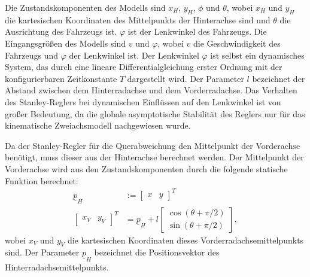 \documentclass[arbeit=studie,oneside,BCOR=12mm]{ArbeitRST}
\begin{document}
Die Zustandskomponenten des Modells sind $x_H$, $y_H$, $\phi$ und $\theta$, wobei
$x_H$ und $y_H$ die kartesischen Koordinaten des Mittelpunkts der Hinterachse
sind und $\theta$ die Ausrichtung des Fahrzeugs ist. $\varphi$ ist der
Lenkwinkel des Fahrzeugs. Die Eingangsgrößen des Modells sind $v$ und
$\varphi$, wobei $v$ die Geschwindigkeit des Fahrzeugs und $\varphi$ der
Lenkwinkel ist. Der Lenkwinkel $\varphi$ ist selbst ein dynamisches System, das
durch eine lineare Differentialgleichung erster Ordnung mit der
konfigurierbaren Zeitkonstante $T$ dargestellt wird. Der Parameter $l$ bezeichnet der Abstand
zwischen dem Hinterradachse und dem Vorderradachse.  Das Verhalten des
Stanley-Reglers bei dynamischen Einflüssen auf den Lenkwinkel ist von großer
Bedeutung, da die globale asymptotische Stabilität des Reglers nur für das
kinematische Zweiachsmodell nachgewiesen wurde. \cite{stanley}

Da der Stanley-Regler für die Querabweichung den Mittelpunkt der Vorderachse
benötigt, muss dieser aus der Hinterachse berechnet werden. Der Mittelpunkt der
Vorderachse wird aus den Zustandskomponenten durch die folgende statische
Funktion berechnet: 
\begin{subequations}
\begin{align}
    \underline{p}_H &:= 
  \begin{bmatrix}
    x & y
  \end{bmatrix}^T \\
  \begin{bmatrix}
    x_V & y_V
  \end{bmatrix}^T
    &= \underline{p}_H + l 
  \begin{bmatrix}
    \cos(\theta + \pi/2) \\ 
    \sin(\theta + \pi/2)
  \end{bmatrix},
  \label{eq:Transformation from Rear Axle to Front Axle}
\end{align}
\end{subequations}
wobei $x_V$ und $y_V$ die kartesischen Koordinaten dieses Vorderradachsemittelpunkts sind.
Der Parameter $\underline{p}_H$ bezeichnet die Positionsvektor des Hinterradachsemittelpunkts.
\end{document}
